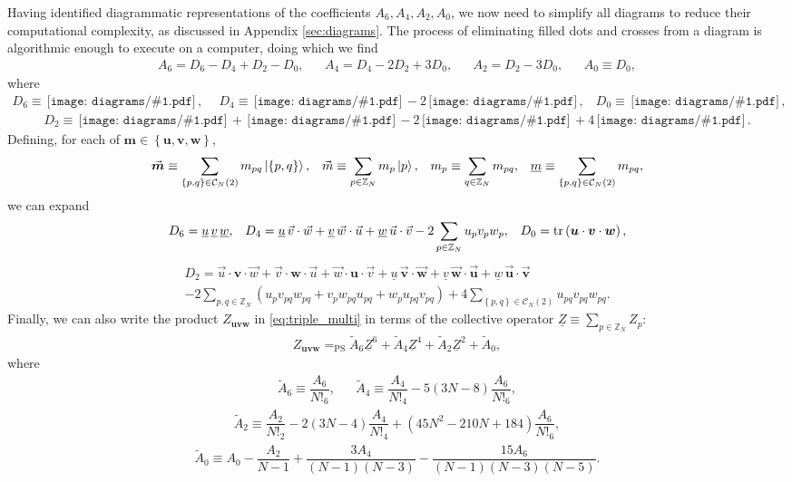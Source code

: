 \documentclass[nofootinbib,notitlepage,11pt]{revtex4-2}
\newcommand{\f}[2]{\dfrac{#1}{#2}} %
\newcommand{\p}[1]{\left(#1\right)} %
\renewcommand{\set}[1]{\left\{#1\right\}} %
\renewcommand{\c}{\cdot} %
\newcommand{\m}{\bm} %
\renewcommand{\v}{\vec} %
\newcommand{\1}{\mathds{1}}
\newcommand{\C}{\mathcal{C}}
\newcommand{\ZZ}{\mathbb{Z}}
\newcommand{\EQPS}{=_{\text{PS}}}
\newcommand{\col}{\underline}
\newcommand{\diagram}[1]
{\,\texttt{[image: diagrams/\#1.pdf]}\,}
\begin{document}
Having identified diagrammatic representations of the coefficients
$A_6,A_4,A_2,A_0$, we now need to simplify all diagrams to reduce
their computational complexity, as discussed in Appendix
\ref{sec:diagrams}.  The process of eliminating filled dots and
crosses from a diagram is algorithmic enough to execute on a computer,
doing which we find
\begin{align}
  A_6 = D_6 - D_4 + D_2 - D_0,
  &&
  A_4 = D_4 - 2 D_2 + 3 D_0,
  &&
  A_2 = D_2 - 3 D_0,
  &&
  A_0 \equiv D_0,
\end{align}
where
\begin{align}
  D_6 \equiv \diagram{triple_0_o},
  &&
  D_4 \equiv \diagram{triple_01_o} - 2 \diagram{triple_1_o},
  &&
  D_0 \equiv \diagram{triple_0111_o},
\end{align}
\begin{align}
  D_2 \equiv \diagram{triple_011_o}
  + \diagram{triple_02_o}
  - 2 \diagram{triple_11_o}
  + 4 \diagram{triple_2_o}.
\end{align}
Defining, for each of $\m m\in\set{\m u,\m v,\m w}$,
\begin{align}
  \v{\m m} \equiv \sum_{\set{p,q}\in\C_N\p{2}} m_{pq} \ket{\set{p,q}},
  &&
  \v m \equiv \sum_{p\in\ZZ_N} m_p \ket{p},
  &&
  m_p \equiv \sum_{q\in\ZZ_N} m_{pq},
  &&
  \col{m} \equiv \sum_{\set{p,q}\in\C_N\p{2}} m_{pq},
\end{align}
we can expand
\begin{align}
  D_6 = \col{u}\,\col{v}\,\col{w},
  &&
  D_4 = \col{u}\,\v v\c\v w + \col{v}\,\v w\c\v u
  + \col{w}\,\v u\c\v v - 2 \sum_{p\in\ZZ_N} u_p v_p w_p,
  &&
  D_0 = \tr\p{\m u \c \m v \c \m w},
\end{align}
\begin{multline}
  D_2 = \v u \c\m v\c\v w + \v v \c\m w\c\v u + \v w \c\m u\c\v v
  + \col{u}\,\v{\m v}\c\v{\m w} + \col{v}\,\v{\m w}\c\v{\m u}
  + \col{w}\,\v{\m u}\c\v{\m v} \\
  - 2 \sum_{p,q\in\ZZ_N} \p{u_p v_{pq} w_{pq}
    + v_p w_{pq} u_{pq} + w_p u_{pq} v_{pq}}
  + 4 \sum_{\set{p,q}\in\C_N\p{2}} u_{pq} v_{pq} w_{pq}.
\end{multline}
Finally, we can also write the product $Z_{\m u\m v\m w}$ in
\eqref{eq:triple_multi} in terms of the collective operator
$\col{Z} \equiv \sum_{p\in\ZZ_N} Z_p$:
\begin{align}
  Z_{\m u\m v\m w} \EQPS
  \tilde A_6 \col{Z}^6 + \tilde A_4 \col{Z}^4
  + \tilde A_2 \col{Z}^2 + \tilde A_0,
  \label{eq:triple_col}
\end{align}
where
\begin{align}
  \tilde A_6 \equiv \f{A_6}{N!_6},
  &&
  \tilde A_4 \equiv \f{A_4}{N!_4} - 5\p{3N-8} \f{A_6}{N!_6},
\end{align}
\begin{align}
  \tilde A_2 \equiv \f{A_2}{N!_2} - 2\p{3N-4} \f{A_4}{N!_4}
  + \p{45N^2-210N+184} \f{A_6}{N!_6},
\end{align}
\begin{align}
  \tilde A_0 \equiv A_0 - \f{A_2}{N-1}
  + \f{3A_4}{\p{N-1}\p{N-3}}
  - \f{15A_6}{\p{N-1}\p{N-3}\p{N-5}}.
\end{align}


\end{document}
